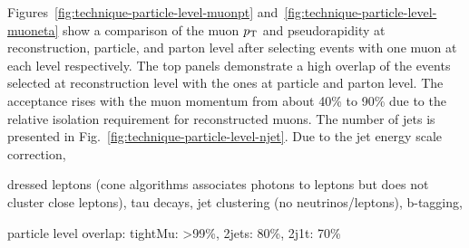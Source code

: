 Figures~\ref{fig:technique-particle-level-muonpt} and~\ref{fig:technique-particle-level-muoneta} show a comparison of the muon $p_\textrm{T}$ and pseudorapidity at reconstruction, particle, and parton level after selecting events with one muon at each level respectively. The top panels demonstrate a high overlap of the events selected at reconstruction level with the ones at particle and parton level. The acceptance rises with the muon momentum from about 40\% to 90\% due to the relative isolation requirement for reconstructed muons. The number of jets is presented in Fig.~\ref{fig:technique-particle-level-njet}. Due to the jet energy scale correction, 


dressed leptons (cone algorithms associates photons to leptons but does not cluster close leptons), tau decays, jet clustering (no neutrinos/leptons), b-tagging,




particle level overlap: tightMu: >99\%, 2jets: 80\%, 2j1t: 70\%


